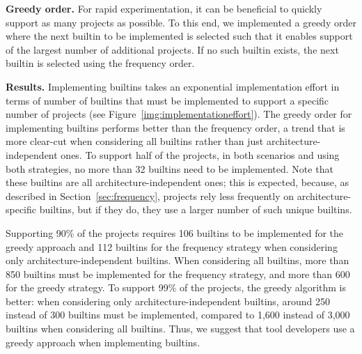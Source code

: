 \documentclass[sigconf,screen]{acmart}
\renewcommand{\paragraph}[1]{\textbf{#1}}
\newcommand\ninetyninepercprojectsapproxnumberbuiltins{1,600} %
\newcommand\halfprojectnumberbuiltins{32} %
\newcommand\approxnumberusedbuiltins{3,000} %
\begin{document}
\paragraph{Greedy order.}
For rapid experimentation, it can be beneficial to quickly support as many projects as possible.
To this end, we implemented a greedy order where the next builtin to be implemented is selected such that it enables support of the largest number of additional projects.
If no such builtin exists, the next builtin is selected using the frequency order.

\paragraph{Results.}
Implementing builtins takes an exponential implementation effort in terms of number of builtins that must be implemented to support a specific number of projects (see Figure~\ref{img:implementationeffort}).
The greedy order for implementing builtins performs better than the frequency order, a trend that is more clear-cut when considering all builtins rather than just architecture-independent ones.
To support half of the projects, in both scenarios and using both strategies, no more than \halfprojectnumberbuiltins{} builtins need to be implemented.
Note that these builtins are all architecture-independent ones; this is expected, because, as described in Section~\ref{sec:frequency}, projects rely less frequently on architecture-specific builtins, but
if they do, they use a larger number of such unique builtins.

Supporting 90\% of the projects requires 106 builtins to be implemented for the greedy approach and 112 builtins for the frequency strategy when considering only architecture-independent builtins.
When considering all builtins, more than 850 builtins must be implemented for the frequency strategy, and more than 600 for the greedy strategy.
To support 99\% of the projects, the greedy algorithm is better: when considering only architecture-independent builtins, around 250 instead of 300 builtins must be implemented, compared to \ninetyninepercprojectsapproxnumberbuiltins{} instead of \approxnumberusedbuiltins{} builtins when considering all builtins.
Thus, we suggest that tool developers use a greedy approach when implementing builtins.
\end{document}
